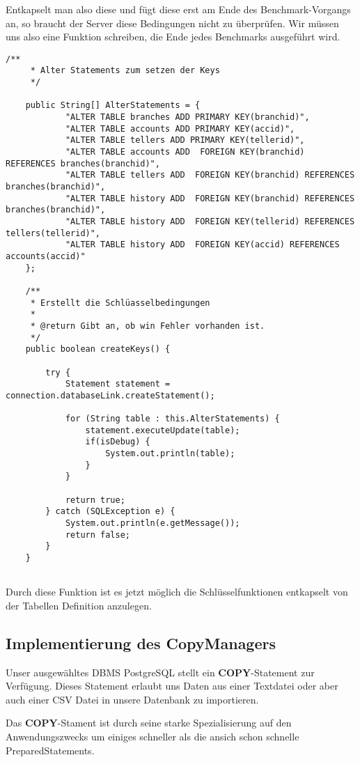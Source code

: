 Entkapselt man also diese und fügt diese erst am Ende des Benchmark-Vorgangs
an, so braucht der Server diese Bedingungen nicht zu überprüfen. Wir müssen uns
also eine Funktion schreiben, die Ende jedes Benchmarks ausgeführt wird.
\begin{lstlisting}[caption={Alter Statements \& Funktion createKeys}]
	/**
	 * Alter Statements zum setzen der Keys
	 */
	
	public String[] AlterStatements = {
			"ALTER TABLE branches ADD PRIMARY KEY(branchid)",
			"ALTER TABLE accounts ADD PRIMARY KEY(accid)",
			"ALTER TABLE tellers ADD PRIMARY KEY(tellerid)",
			"ALTER TABLE accounts ADD  FOREIGN KEY(branchid) REFERENCES branches(branchid)",
			"ALTER TABLE tellers ADD  FOREIGN KEY(branchid) REFERENCES branches(branchid)",
			"ALTER TABLE history ADD  FOREIGN KEY(branchid) REFERENCES branches(branchid)",
			"ALTER TABLE history ADD  FOREIGN KEY(tellerid) REFERENCES tellers(tellerid)",
			"ALTER TABLE history ADD  FOREIGN KEY(accid) REFERENCES accounts(accid)"
	};
	
	/**
	 * Erstellt die Schlüasselbedingungen
	 * 
	 * @return Gibt an, ob win Fehler vorhanden ist.
	 */
	public boolean createKeys() {
	
		try {
			Statement statement = connection.databaseLink.createStatement();

			for (String table : this.AlterStatements) {
				statement.executeUpdate(table);
				if(isDebug) {
					System.out.println(table);
				}
			}

			return true;
		} catch (SQLException e) {
			System.out.println(e.getMessage());
			return false;
		}
	}
		
\end{lstlisting}

Durch diese Funktion ist es jetzt möglich die Schlüsselfunktionen entkapselt von
der Tabellen Definition anzulegen.


\subsection{Implementierung des CopyManagers}
Unser ausgewähltes DBMS PostgreSQL stellt ein \textbf{COPY}-Statement zur
Verfügung. Dieses Statement erlaubt uns Daten aus einer Textdatei oder aber auch
einer CSV Datei in unsere Datenbank zu importieren. 

Das \textbf{COPY}-Stament ist durch seine starke Spezialisierung auf den
Anwendungszwecks um einiges schneller als die ansich schon schnelle
PreparedStatements.

